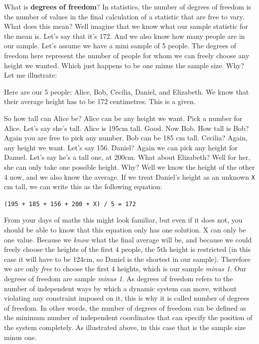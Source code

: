 \documentclass[]{book}
\theoremstyle{definition}
\theoremstyle{definition}
\theoremstyle{definition}
\theoremstyle{remark}
\begin{document}
What is \textbf{degrees of freedom}? In statistics, the number of
degrees of freedom is the number of values in the final calculation of a
statistic that are free to vary. What does this mean? Well imagine that
we know what our sample statistic for the mean is. Let's say that it's
172. And we also know how many people are in our sample. Let's assume we
have a mini sample of 5 people. The degrees of freedom here represent
the number of people for whom we can freely choose any height we wanted.
Which just happens to be one minus the sample size. Why? Let me
illustrate:

Here are our 5 people: Alice, Bob, Cecilia, Daniel, and Elizabeth. We
know that their average height has to be 172 centimetres. This is a
given.

So how tall can Alice be? Alice can be any height we want. Pick a number
for Alice. Let's say she's tall. Alice is 195cm tall. Good. Now Bob. How
tall is Bob? Again you are free to pick any number. Bob can be 185 cm
tall. Cecilia? Again, any height we want. Let's say 156. Daniel? Again
we can pick any height for Danuel. Let's say he's a tall one, at 200cm.
What about Elizabeth? Well for her, she can only take one possible
height. Why? Well we know the height of the other 4 now, and we also
know the average. If we treat Daniel's height as an unknown \texttt{X}
cm tall, we can write this as the following equation:

\texttt{(195\ +\ 185\ +\ 156\ +\ 200\ +\ X)\ /\ 5\ =\ 172}

From your days of maths this might look familiar, but even if it does
not, you should be able to know that this equation only has one
solution. X can only be one value. Because we \emph{know} what the final
average will be, and because we could freely choose the heights of the
first 4 people, the 5th height is restricted (in this case it will have
to be 124cm, so Daniel is the shortest in our sample). Therefore we are
only \emph{free} to choose the first 4 heights, which is our sample
\emph{minus 1}. Our degrees of freedom are sample \emph{minus 1}. As
degrees of freedom refers to the number of independent ways by which a
dynamic system can move, without violating any constraint imposed on it,
this is why it is called number of degrees of freedom. In other words,
the number of degrees of freedom can be defined as the minimum number of
independent coordinates that can specify the position of the system
completely. As illustrated above, in this case that is the sample size
minus one.
\end{document}
